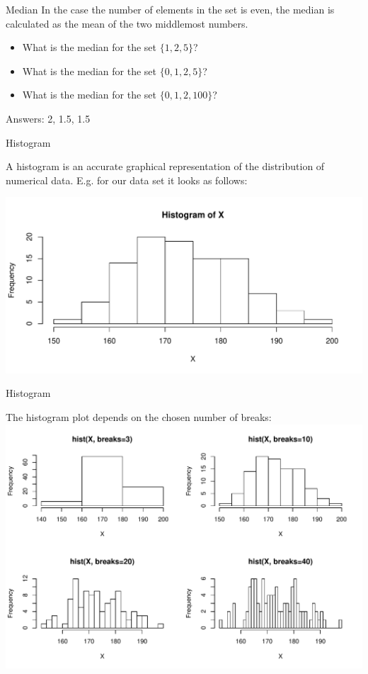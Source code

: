 \begin{frame}{Median}
    In the case the number of elements in the set is even, the median is calculated as the mean of the two middlemost numbers.
    
    \begin{example}
        \medskip
        \begin{itemize}
            \item What is the median for the set $\{1, 2, 5\}$?
            \item What is the median for the set $\{0, 1, 2, 5\}$?
            \item What is the median for the set $\{0, 1, 2, 100\}$?
        \end{itemize}
    \end{example}

    Answers: 2, 1.5, 1.5

\end{frame}

\begin{frame}{Histogram}

A histogram is an accurate graphical representation of the distribution of numerical data. E.g. for our data set it looks as follows:

\includegraphics[width=\textwidth]{R/plots/distrib-histogram}

\end{frame}

\begin{frame}{Histogram}

The histogram plot depends on the chosen number of breaks:
\includegraphics[width=\textwidth]{R/plots/distrib-histogram-bins}

\end{frame}

